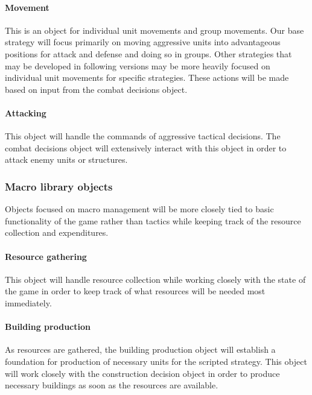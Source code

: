 \documentclass[10pt,letterpaper,onecolumn,draftclsnofoot]{IEEEtran}
\begin{document}
\paragraph{Movement}
This is an object for individual unit movements and group movements. Our base strategy will focus primarily on moving aggressive units into advantageous positions for attack and defense and doing so in groups. Other strategies that may be developed in following versions may be more heavily focused on individual unit movements for specific strategies. These actions will be made based on input from the combat decisions object.
\vspace{1mm}

\paragraph{Attacking}
This object will handle the commands of aggressive tactical decisions. The combat decisions object will extensively interact with this object in order to attack enemy units or structures.
\vspace{1mm}

\subsubsection{Macro library objects}
Objects focused on macro management will be more closely tied to basic functionality of the game rather than tactics while keeping track of the resource collection and expenditures.
\vspace{1mm}

\paragraph{Resource gathering}
This object will handle resource collection while working closely with the state of the game in order to keep track of what resources will be needed most immediately.
\vspace{1mm}

\paragraph{Building production}
As resources are gathered, the building production object will establish a foundation for production of necessary units for the scripted strategy. This object will work closely with the construction decision object in order to produce necessary buildings as soon as the resources are available.
\vspace{1mm}
\end{document}
